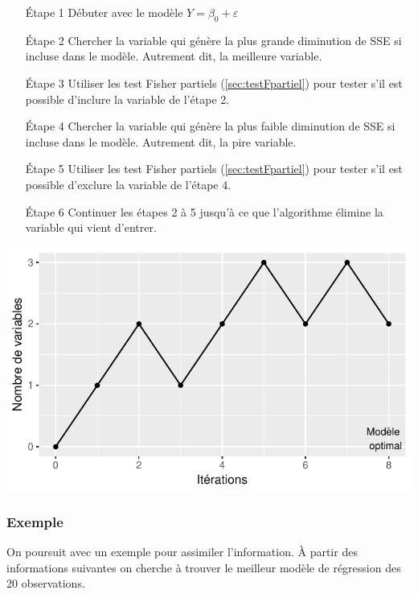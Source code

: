 \documentclass[11pt,french]{report}
\begin{document}
\begin{itemize}
\item [Étape 1] Débuter avec le modèle $Y = \beta_0 + \varepsilon$

\item [Étape 2] Chercher la variable qui génère la plus grande diminution de SSE si incluse dans le modèle. Autrement dit, la meilleure variable.

\item [Étape 3] Utiliser les test Fisher partiels (\ref{sec:testFpartiel}) pour tester s'il est possible d'inclure la variable de l'étape 2.

\item [Étape 4] Chercher la variable qui génère la plus faible diminution de SSE si incluse dans le modèle. Autrement dit, la pire variable.

\item [Étape 5] Utiliser les test Fisher partiels (\ref{sec:testFpartiel}) pour tester s'il est possible d'exclure la variable de l'étape 4.

\item [Étape 6] Continuer les étapes 2 à 5 jusqu'à ce que l'algorithme élimine la variable qui vient d'entrer.
\end{itemize}
\bigskip

\includegraphics{notes_de_cours-028}

\bigskip
\subsubsection*{Exemple}
On poursuit avec un exemple pour assimiler l'information. \newline
À partir des informations suivantes on cherche à trouver le meilleur modèle de régression des 20 observations.
\bigskip
\end{document}
